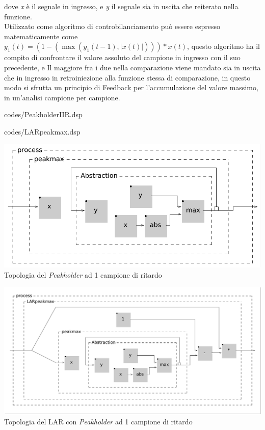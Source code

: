 dove \textit{x} è il segnale in ingresso, e \textit{y} il segnale sia in uscita che reiterato nella funzione. \\
Utilizzato come algoritmo di controbilanciamento può essere espresso matematicamente come
\( y_{1}(t) = (1-(\max\left( y_{1}(t\!-\!1), \left\lvert{x(t)}\right\rvert \right))) * x(t) \), 
questo algoritmo ha il compito di confrontare il valore assoluto del campione in ingresso con il suo precedente,
e Il maggiore fra i due nella comparazione viene mandato sia in uscita che in ingresso 
in retroiniezione alla funzione stessa di comparazione, 
in questo modo si sfrutta un principio di Feedback per l'accumulazione
del valore massimo, in un'analisi campione per campione.

\vspace{0.5cm} 

{codes/PeakholderIIR.dsp}

\vspace{0.5cm} 

{codes/LARpeakmax.dsp}

\begin{center}
    \includegraphics[width=14cm]{figures/PeakholderIIR.pdf} \\
    {Topologia del \textit{Peakholder} ad 1 campione di ritardo} \\ 
    \end{center}

\begin{center}
    \includegraphics[width=14cm]{figures/LARpeakmax.pdf} \\
    {Topologia del LAR con \textit{Peakholder} ad 1 campione di ritardo} \\ 
\end{center}
\vspace{0.5cm}

